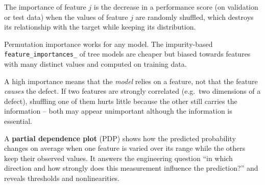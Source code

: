 \documentclass[
  letterpaper,
  DIV=11,
  numbers=noendperiod]{scrreprt}
\begin{document}
\begin{tcolorbox}[enhanced jigsaw, left=2mm, title=\textcolor{quarto-callout-note-color}{\faInfo}\hspace{0.5em}{Definition: Permutation importance}, opacityback=0, breakable, rightrule=.15mm, arc=.35mm, toptitle=1mm, colbacktitle=quarto-callout-note-color!10!white, opacitybacktitle=0.6, coltitle=black, colframe=quarto-callout-note-color-frame, bottomrule=.15mm, leftrule=.75mm, bottomtitle=1mm, titlerule=0mm, toprule=.15mm, colback=white]

The importance of feature \(j\) is the decrease in a performance score
(on validation or test data) when the values of feature \(j\) are
randomly shuffled, which destroys its relationship with the target while
keeping its distribution.

\end{tcolorbox}

Permutation importance works for any model. The impurity-based
\texttt{feature\_importances\_} of tree models are cheaper but biased
towards features with many distinct values and computed on training
data.

\begin{tcolorbox}[enhanced jigsaw, left=2mm, title=\textcolor{quarto-callout-warning-color}{\faExclamationTriangle}\hspace{0.5em}{Pitfall: importance is not causality -- and correlated features share
importance}, opacityback=0, breakable, rightrule=.15mm, arc=.35mm, toptitle=1mm, colbacktitle=quarto-callout-warning-color!10!white, opacitybacktitle=0.6, coltitle=black, colframe=quarto-callout-warning-color-frame, bottomrule=.15mm, leftrule=.75mm, bottomtitle=1mm, titlerule=0mm, toprule=.15mm, colback=white]

A high importance means that the \emph{model} relies on a feature, not
that the feature \emph{causes} the defect. If two features are strongly
correlated (e.g.~two dimensions of a defect), shuffling one of them
hurts little because the other still carries the information -- both may
appear unimportant although the information is essential.

\end{tcolorbox}

A \textbf{partial dependence plot} (PDP) shows how the predicted
probability changes on average when one feature is varied over its range
while the others keep their observed values. It answers the engineering
question ``in which direction and how strongly does this measurement
influence the prediction?'' and reveals thresholds and nonlinearities.
\end{document}
